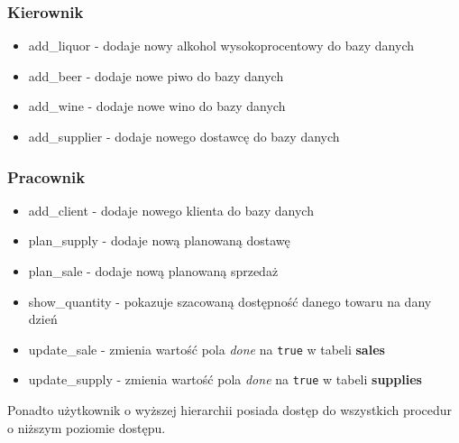 \documentclass[12pt,a4paper]{article}
\begin{document}
    \subsubsection*{Kierownik}
        \begin{itemize}
            \item \textsf{add\_liquor} - dodaje nowy alkohol wysokoprocentowy do bazy danych
            \item \textsf{add\_beer} - dodaje nowe piwo do bazy danych
            \item \textsf{add\_wine} - dodaje nowe wino do bazy danych
            \item \textsf{add\_supplier} - dodaje nowego dostawcę do bazy danych
        \end{itemize}
    
    \subsubsection*{Pracownik}
        \begin{itemize}
            \item \textsf{add\_client} - dodaje nowego klienta do bazy danych
            \item \textsf{plan\_supply} - dodaje nową planowaną dostawę
            \item \textsf{plan\_sale} - dodaje nową planowaną sprzedaż
            \item \textsf{show\_quantity} - pokazuje szacowaną dostępność danego towaru na dany dzień
            \item \textsf{update\_sale} - zmienia wartość pola \textit{done} na \texttt{true} w tabeli \textbf{sales}
            \item \textsf{update\_supply} - zmienia wartość pola \textit{done} na \texttt{true} w tabeli \textbf{supplies}
        \end{itemize}
        
        Ponadto użytkownik o wyższej hierarchii posiada dostęp do wszystkich procedur o niższym poziomie dostępu.
        
\end{document}
